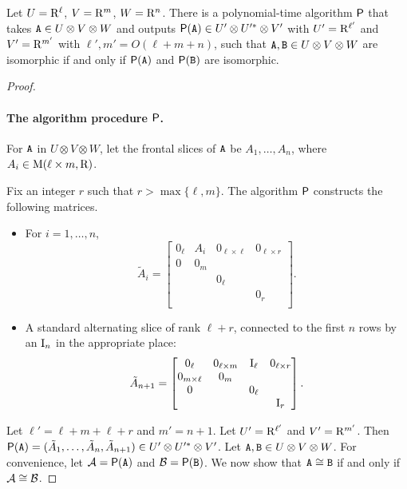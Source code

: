\begin{theorem} \label{thm:3-tensor_conjugacy}
	Let $U=\mathrm{R}^\ell$, $V=\mathrm{R}^m$, $W=\mathrm{R}^n$. There is a polynomial-time algorithm ${\sf P}$ that takes $\mathtt{A}\in U\otimes V\otimes W$ and outputs ${\sf P}(\mathtt{A})\in U'\otimes U'^*\otimes V'$ with $U'= \mathrm{R}^{\ell'}$ and $V'=\mathrm{R}^{m'}$ with $\ell', m'=O(\ell+m+n)$, such that $\mathtt{A}, \mathtt{B}\in U\otimes V\otimes W$ are isomorphic if and only if ${\sf P}(\mathtt{A})$ and ${\sf P}(\mathtt{B})$ are isomorphic.
\end{theorem}
\begin{proof}
	\paragraph{The algorithm procedure ${\sf P}$.}
	For $\mathtt{A}$ in $U\otimes V\otimes W$, let the frontal slices of $\mathtt{A}$ be $A_1, \dotsc, A_n$, where $A_i\in\mathrm{M}(\ell\times m, \mathrm{R})$. 
	
	Fix an integer $r$ such that $r>\max\{\ell,m\}$. The algorithm ${\sf P}$ constructs the following matrices. 
	\begin{itemize}
		\item For $i=1,\dotsc,n$,
		\[
		\tilde A_{i} =
		\begin{bmatrix}
			0_{\ell} & A_i & 0_{\ell \times \ell} & 0_{\ell \times r}  \\
			0 & 0_{m}  \\
			& & 0_\ell \\
			& & & 0_{r} \\
		\end{bmatrix}.
		\]
		
		\item A standard alternating slice of rank $\ell+r$, connected to the first $n$ rows by an $\mathrm{I}_n$ in the appropriate place:
		\[
		\tilde A_{n+1} = 
		\begin{bmatrix}
			0_\ell& 0_{\ell \times m}  & \mathrm{I}_\ell  & 0_{\ell \times r} \\
			0_{m \times \ell} & 0_m & \\
			0 &  & 0_\ell \\
			& & & \mathrm{I}_r \\
		\end{bmatrix}.
		\]
	\end{itemize}
	Let $\ell'=\ell+m+\ell+r$ and $m'=n+1$. Let $U'=\mathrm{R}^{\ell'}$ and $V'=\mathrm{R}^{m'}$. Then ${\sf P}(\mathtt{A})=(\tilde A_1, \dots, \tilde A_n, \tilde A_{n+1})\in U'\otimes U'^*\otimes V'$.
	Let $\mathtt{A}, \mathtt{B}\in U\otimes V\otimes W$. For convenience, let $\mathcal{A}={\sf P}(\mathtt{A})$ and $\mathcal{B}={\sf P}(\mathtt{B})$. We now show that $\mathtt{A}\cong \mathtt{B}$ if and only if $\mathcal{A}\cong \mathcal{B}$.
	

\end{proof}
